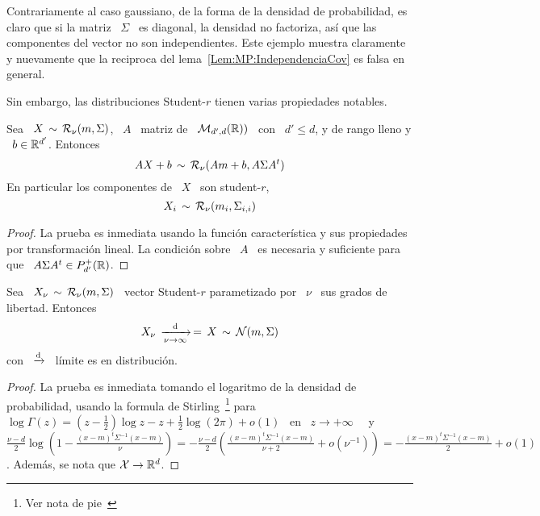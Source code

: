 Contrariamente al caso gaussiano, de la forma de la densidad de probabilidad, es
claro que si la matriz \ $\Sigma$ \ es diagonal, la densidad no factoriza, as\'i
que  las componentes  del vector  no son  independientes.  Este  ejemplo muestra
claramente y nuevamente  que la reciproca del lema~\ref{Lem:MP:IndependenciaCov}
es falsa en general.

Sin embargo, las distribuciones Student-$r$ tienen varias propiedades notables.

\begin{lema}
\label{Lem:MP:StabilidadLinealStudentR}
%
  Sea \ $X \, \sim \,  \mathcal{R}_\nu(m,\Sigma)$, \ $A$ \ matriz de \ $\mathcal{M}_{d',d}(\mathbb{R}))$
  \ con \ $d' \le d$, y de rango lleno y \ $b \in \mathbb{R}^{d'}$. Entonces
  \[
  A X + b\, \sim \, \mathcal{R}_\nu( A m + b , A \Sigma A^t)
  \]
  En particular los componentes de \ $X$ \ son student-$r$,
  \[
  X_i \, \sim \, \mathcal{R}_\nu(m_i , \Sigma_{i,i} )
  \]
\end{lema}
\begin{proof}
  La prueba es inmediata usando  la funci\'on caracter\'istica y sus propiedades
  por  transformaci\'on lineal.  La condici\'on  sobre \  $A$ \  es  necesaria y
  suficiente para que \ $A \Sigma A^t \in P_{d'}^+(\mathbb{R})$.
\end{proof}

\begin{lema}
\label{Lem:MP:LimiteStudentRGaussiana}
%
  Sea \  $X_\nu \, \sim  \, \mathcal{R}_\nu(m,\Sigma)$ \ vector  Student-$r$ parametizado
  por \ $\nu$ \ sus grados de libertad. Entonces
  \[
  X_\nu \, \xrightarrow[\nu \to \infty]{\mathrm{d}} \, = \, X \, \sim \, \mathcal{N}(m,\Sigma)
  \]
  con \ $\displaystyle \xrightarrow[]{\mathrm{d}}$ \ l\'imite es en distribuci\'on.
\end{lema}
\begin{proof}
  La prueba  es inmediata tomando el  logaritmo de la  densidad de probabilidad,
  usando      la     formula      de     Stirling~\footnote{Ver      nota     de
    pie~} para  \ $\log\Gamma(z) = \left(  z - \frac12
  \right)  \log  z  -  z  +  \frac12   \log(2  \pi)  +  o(1)$  \  en  \  $z  \to
  +\infty$~\cite{Sti30, AbrSte70, GraRyz15} \  y \ $\frac{\nu-d}{2} \log\left( 1
    - \frac{(x-m)^t  \Sigma^{-1} (x-m)}{\nu} \right) =  - \frac{\nu-d}{2} \left(
    \frac{(x-m)^t \Sigma^{-1} (x-m)}{\nu+2} + o\left( \nu^{-1} \right) \right) =
  - \frac{(x-m)^t \Sigma^{-1}  (x-m)}{2} + o(1)$. Adem\'as, se  nota que $\mathcal{X} \to
  \mathbb{R}^d$.
\end{proof}


